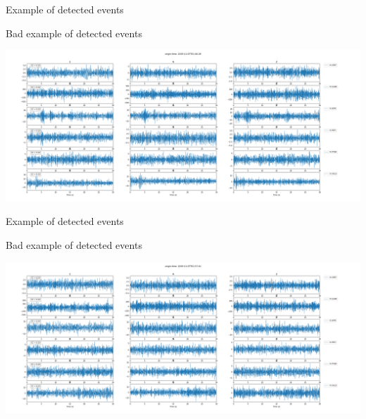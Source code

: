 \documentclass[aspectratio=43,9pt]{beamer}
\begin{document}
\begin{frame}{Example of detected events}
 
   \begin{minipage}{1\linewidth}
    \centering Bad example of detected events 
    \vskip 0.4cm 
    \begin{center}
     \includegraphics[width=1\linewidth]{figs/bad_2019-11-07T01-40-28-1p2.png}     
    \end{center}
  \end{minipage}
   
\end{frame}

\begin{frame}{Example of detected events}
 
   \begin{minipage}{1\linewidth}
    \centering Bad example of detected events 
    \vskip 0.4cm 
    \begin{center}
     \includegraphics[width=1\linewidth]{figs/bad2_2019-11-07T01-57-41-1p4.png}     
    \end{center}
  \end{minipage}
   
\end{frame}
\end{document}
